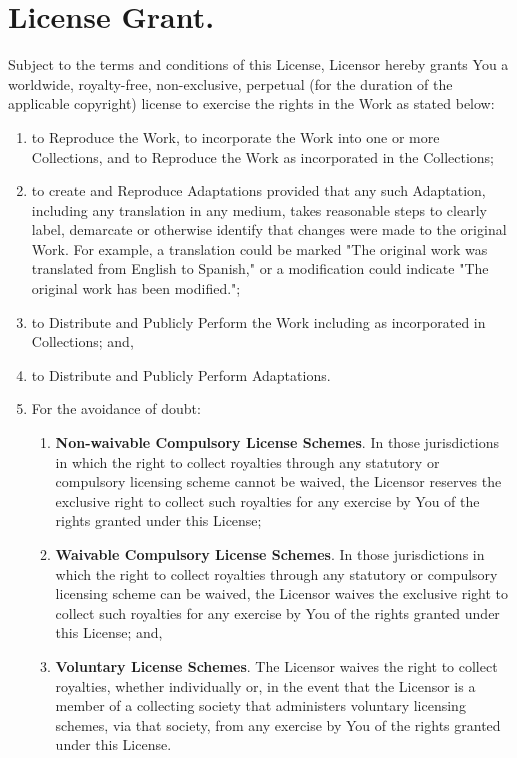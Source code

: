 \documentclass[10pt]{book}
\begin{document}
\section{ License Grant.} Subject to the terms         and conditions of this License, Licensor hereby grants You         a worldwide, royalty-free, non-exclusive, perpetual (for         the duration of the applicable copyright) license to         exercise the rights in the Work as stated below:
\begin{enumerate}
	\item to Reproduce the Work, to incorporate the Work into           one or more Collections, and to Reproduce the Work as           incorporated in the Collections;
	\item to create and Reproduce Adaptations provided that any           such Adaptation, including any translation in any medium,           takes reasonable steps to clearly label, demarcate or           otherwise identify that changes were made to the original           Work. For example, a translation could be marked "The           original work was translated from English to Spanish," or           a modification could indicate "The original work has been           modified.";
	\item to Distribute and Publicly Perform the Work including           as incorporated in Collections; and,
	\item to Distribute and Publicly Perform Adaptations.
	\item 

For the avoidance of doubt:
\begin{enumerate}
	\item \textbf{Non-waivable Compulsory License               Schemes}. In those jurisdictions in which the               right to collect royalties through any statutory or               compulsory licensing scheme cannot be waived, the               Licensor reserves the exclusive right to collect such               royalties for any exercise by You of the rights               granted under this License;
	\item \textbf{Waivable Compulsory License               Schemes}. In those jurisdictions in which the               right to collect royalties through any statutory or               compulsory licensing scheme can be waived, the               Licensor waives the exclusive right to collect such               royalties for any exercise by You of the rights               granted under this License; and,
	\item \textbf{Voluntary License Schemes}. The               Licensor waives the right to collect royalties,               whether individually or, in the event that the               Licensor is a member of a collecting society that               administers voluntary licensing schemes, via that               society, from any exercise by You of the rights               granted under this License.
\end{enumerate}
\end{enumerate}
\end{document}
